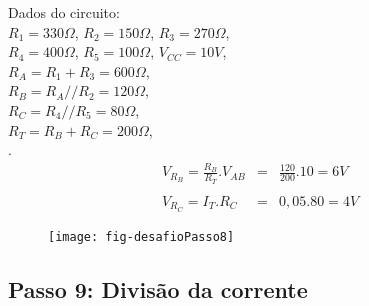 \begin{minipage}{\linewidth}
  \centering
  \begin{minipage}{0.45\linewidth}
    Dados do circuito: \\
                $R_1 = 330\Omega$,
                $R_2 = 150\Omega$,
                $R_3 = 270\Omega$, \\
                $R_4 = 400\Omega$,
                $R_5 = 100\Omega$,
                $V_{CC} = 10V$, \\
                $R_A = R_1 + R_3 = 600\Omega$, \\
                $R_B = R_A // R_2 = 120\Omega$, \\
                $R_C = R_4 // R_5 = 80\Omega$, \\
                $R_T = R_B + R_C = 200\Omega$, \\
                .
                \color{red}
    \begin{eqnarray}
      V_{R_B} = \frac{R_B}{R_T} . V_{AB} & = & \frac{120}{200} . 10 = 6V \nonumber\\
      \nonumber\\
      V_{R_C} = I_T.R_C & = & 0,05.80 = 4V
    \end{eqnarray}
  \end{minipage}
  \hspace{0.05\linewidth}
  \begin{minipage}{0.45\linewidth}
    \begin{figure}[H]
      \centering
      \texttt{[image: fig-desafioPasso8]}
    \end{figure}
  \end{minipage}
\end{minipage}





\subsection{Passo 9: Divisão da corrente}

